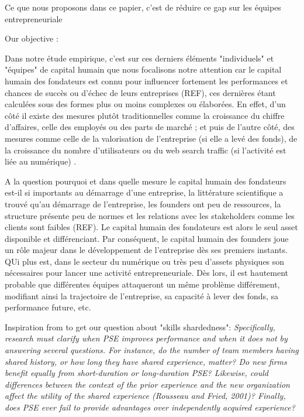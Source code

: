 \documentclass[12pt]{article}
\begin{document}
Ce que nous proposons dans ce papier, c'est de réduire ce gap sur les équipes entrepreneuriale

Our objective :

Dans notre étude empirique, c'est sur ces derniers éléments "individuels" et "équipes" de capital humain que nous focalisons notre attention car le capital humain des fondateurs  est connu pour influencer fortement les performances et chances de succès ou d'échec de leurs entreprises (REF), ces dernières étant calculées sous des formes plus ou moins complexes ou élaborées. En effet, d'un côté il existe des mesures plutôt traditionnelles comme la croissance du chiffre d'affaires, celle des employés ou des parts de marché ; et puis de l'autre côté, des mesures comme celle de la valorisation de l'entreprise (si elle a levé des fonds), de la croissance du nombre d'utilisateurs ou du web search traffic (si l'activité est liée au numérique) \citep{malyy2021value}.

A la question pourquoi et dans quelle mesure le capital humain des fondateurs est-il si importants au démarrage d'une entreprise, la littérature scientifique a trouvé qu'au démarrage de l'entreprise, les founders ont peu de ressources, la structure présente peu de normes et les relations avec les stakeholders comme les clients sont faibles (REF). Le capital humain des fondateurs est alors le seul asset disponible et différenciant. Par conséquent, le capital humain des founders joue un rôle majeur dans le développement de l'entreprise dès ses premiers instants. QUi plus est, dans le secteur du numérique ou très peu d'assets physiques son nécessaires pour lancer une activité entrepreneuriale. Dès lors, il est hautement probable que différentes équipes attaqueront un même problème différement, modifiant ainsi la trajectoire de l'entreprise, sa capacité à lever des fonds, sa performance future, etc.

Inspiration from \citep{zheng2016shared} to get our question about "skills shardedness": \textit{Specifically, research must clarify when PSE improves performance and when it does not by answering several questions. For instance, do the number of team members having shared history, or how long they have shared experience, matter? Do new firms benefit equally from short-duration or long-duration PSE? Likewise, could differences between the context of the prior experience and the new organization affect the utility of the shared experience (Rousseau and Fried, 2001)? Finally, does PSE ever fail to provide advantages over independently acquired experience?}
\end{document}
